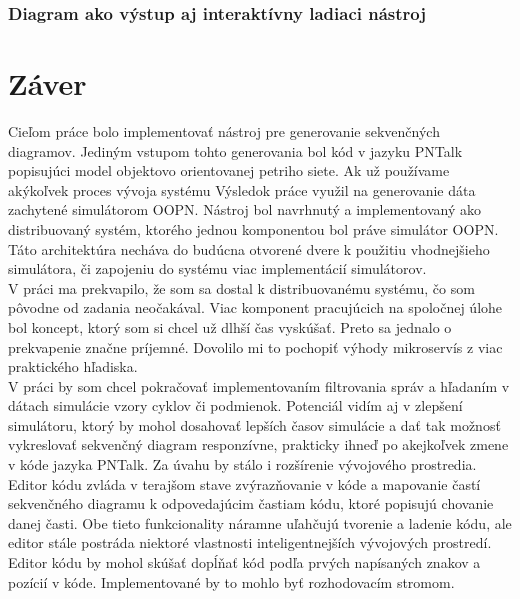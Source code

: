 \subsection{Diagram ako výstup aj interaktívny ladiaci nástroj}

\chapter{Záver}

Cieľom práce bolo implementovať nástroj pre generovanie sekvenčných diagramov. Jediným vstupom tohto generovania bol kód v jazyku PNTalk popisujúci model objektovo orientovanej petriho siete. Ak už používame akýkoľvek proces vývoja systému Výsledok práce využil na generovanie dáta zachytené simulátorom OOPN. Nástroj bol navrhnutý a implementovaný ako distribuovaný systém, ktorého jednou komponentou bol práve simulátor OOPN. Táto architektúra necháva do budúcna otvorené dvere k použitiu vhodnejšieho simulátora, či zapojeniu do systému viac implementácií simulátorov. \\

V práci ma prekvapilo, že som sa dostal k distribuovanému systému, čo som pôvodne od zadania neočakával. Viac komponent pracujúcich na spoločnej úlohe bol koncept, ktorý som si chcel už dlhší čas vyskúšať. Preto sa jednalo o prekvapenie značne príjemné. Dovolilo mi to pochopiť výhody mikroservís z viac praktického hľadiska. \\

V práci by som chcel pokračovať implementovaním filtrovania správ a hľadaním v dátach simulácie vzory cyklov či podmienok. Potenciál vidím aj v zlepšení simulátoru, ktorý by mohol dosahovať lepších časov simulácie a dať tak možnosť vykreslovať sekvenčný diagram responzívne, prakticky ihneď po akejkoľvek zmene v kóde jazyka PNTalk. Za úvahu by stálo i rozšírenie vývojového prostredia.
Editor kódu zvláda v terajšom stave zvýrazňovanie v kóde a mapovanie častí sekvenčného diagramu k odpovedajúcim častiam kódu, ktoré popisujú chovanie danej časti. Obe tieto funkcionality náramne uľahčujú tvorenie a ladenie kódu, ale editor stále postráda niektoré vlastnosti inteligentnejších vývojových prostredí. Editor kódu by mohol skúšať dopĺňať kód podľa prvých napísaných znakov a pozícií v kóde. Implementované by to mohlo byť rozhodovacím stromom. 


